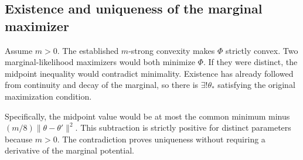 \documentclass[11pt,a4paper]{report}
\begin{document}
\subsection{\texorpdfstring{Existence and uniqueness of the marginal maximizer}{Existence and uniqueness of the marginal maximizer}}
\label{report-step-IPLA-StrongLogConcavity-lean-4}


Assume \(m>0\). The established \(m\)-strong convexity makes \(\Phi\) strictly convex. Two marginal-likelihood maximizers would both minimize \(\Phi\). If they were distinct, the midpoint inequality would contradict minimality. Existence has already followed from continuity and decay of the marginal, so there is \(\exists!\theta_*\) satisfying the original maximization condition.



Specifically, the midpoint value would be at most the common minimum minus \((m/8)\|\theta-\theta'\|^2\). This subtraction is strictly positive for distinct parameters because \(m>0\). The contradiction proves uniqueness without requiring a derivative of the marginal potential.
\end{document}
